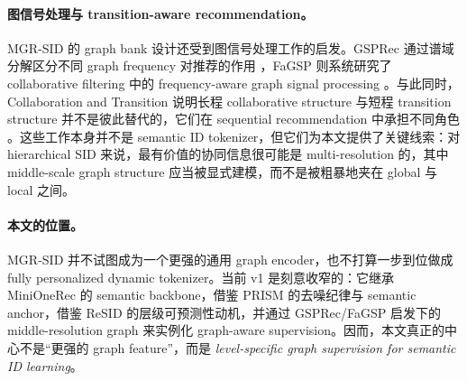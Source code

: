 \paragraph{图信号处理与 transition-aware recommendation。}
MGR-SID 的 graph bank 设计还受到图信号处理工作的启发。GSPRec 通过谱域分解区分不同 graph frequency 对推荐的作用 \citep{rabiah2025gsprec}，FaGSP 则系统研究了 collaborative filtering 中的 frequency-aware graph signal processing \citep{xia2024fagsp}。与此同时，Collaboration and Transition 说明长程 collaborative structure 与短程 transition structure 并不是彼此替代的，它们在 sequential recommendation 中承担不同角色 \citep{zhu2023collaborationtransition}。这些工作本身并不是 semantic ID tokenizer，但它们为本文提供了关键线索：对 hierarchical SID 来说，最有价值的协同信息很可能是 multi-resolution 的，其中 middle-scale graph structure 应当被显式建模，而不是被粗暴地夹在 global 与 local 之间。

\paragraph{本文的位置。}
MGR-SID 并不试图成为一个更强的通用 graph encoder，也不打算一步到位做成 fully personalized dynamic tokenizer。当前 v1 是刻意收窄的：它继承 MiniOneRec 的 semantic \rqvae{} backbone，借鉴 PRISM 的去噪纪律与 semantic anchor，借鉴 ReSID 的层级可预测性动机，并通过 GSPRec/FaGSP 启发下的 middle-resolution graph 来实例化 graph-aware supervision。因而，本文真正的中心不是“更强的 graph feature”，而是 \emph{level-specific graph supervision for semantic ID learning}。
